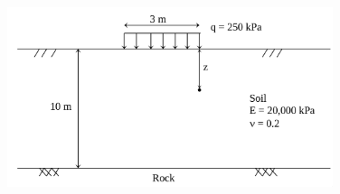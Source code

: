 \documentclass[a4paper,12pt]{article}
\begin{document}
\begin{enumerate}
	\begin{figure}[!h]
		\centering
		\includegraphics[width=0.85\textwidth]{figs/footing.png}
	\end{figure}
\end{enumerate}
\end{document}

